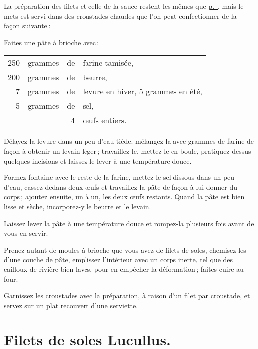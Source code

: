 La préparation des filets et celle de la sauce restent les mêmes que
\hyperlink{p0369}{p. \pageref{pg0369}}. mais le mets est servi dans des croustades
chaudes que l’on peut confectionner de la façon suivante :

\label{pg0371} \hypertarget{p0371}{}
Faites une pâte à brioche avec :

\medskip

\footnotesize
\begin{longtable}{rrrp{16em}}
    250 & grammes & de & farine tamisée,                                                                  \\
    200 & grammes & de & beurre,                                                                          \\
      7 & grammes & de & levure en hiver, 5 grammes en été,                                               \\
      5 & grammes & de & sel,                                                                             \\
        &         &  4 & œufs entiers.                                                                    \\
\end{longtable}
\normalsize

Délayez la levure dans un peu d'eau tiède. mélangez-la avec {\mmm} grammes de
farine de façon à obtenir un levain léger ; travaillez-le, mettez-le en boule,
pratiquez dessus quelques incisions et laissez-le lever à une température
douce.

Formez fontaine avec le reste de la farine, mettez le sel dissous dans un peu
d'eau, cassez dedans deux œufs et travaillez la pâte de façon à lui donner du
corps ; ajoutez ensuite, un à un, les deux œufs restants. Quand la pâte est
bien lisse et sèche, incorporez-y le beurre et le levain.

Laissez lever la pâte à une température douce et rompez-la plusieurs fois avant
de vous en servir.

Prenez autant de moules à brioche que vous avez de filets de soles,
chemisez-les d'une couche de pâte, emplissez l'intérieur avec un corps inerte,
tel que des cailloux de rivière bien lavés, pour en empêcher la déformation ;
faites cuire au four.

Garnissez les croustades avec la préparation, à raison d'un filet par
croustade, et servez sur un plat recouvert d’une serviette.

\section*{\centering Filets de soles Lucullus.}

